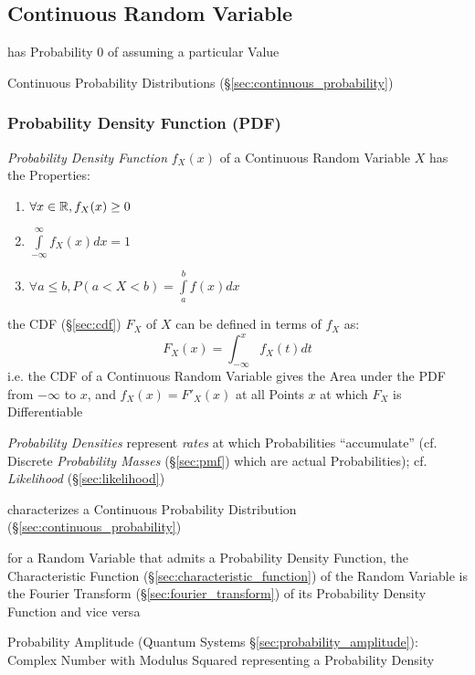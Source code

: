 \subsection{Continuous Random Variable}\label{sec:continuous_random_variable}

has Probability $0$ of assuming a particular Value

\fist Continuous Probability Distributions (\S\ref{sec:continuous_probability})



\subsubsection{Probability Density Function (PDF)}\label{sec:pdf}

\emph{Probability Density Function} $f_X(x)$ of a Continuous Random Variable $X$
has the Properties:
\begin{enumerate}
  \item $\forall x \in \mathbb{R}, f_X(x) \geq 0$
  \item $\int\limits_{-\infty}^{\infty} f_X(x) dx = 1$
  \item $\forall a \leq b, P (a < X < b) = \int\limits_a^b f(x) dx$
\end{enumerate}
the CDF (\S\ref{sec:cdf}) $F_X$ of $X$ can be defined in terms of $f_X$ as:
\[
  F_X(x) = \int_{-\infty}^x f_X(t)dt
\]
i.e. the CDF of a Continuous Random Variable gives the Area under the PDF from
$-\infty$ to $x$, and $f_X(x) = F'_X(x)$ at all Points $x$ at which $F_X$ is
Differentiable

\emph{Probability Densities} represent \emph{rates} at which Probabilities
``accumulate'' (cf. Discrete \emph{Probability Masses} (\S\ref{sec:pmf}) which
are actual Probabilities); cf. \emph{Likelihood} (\S\ref{sec:likelihood})

characterizes a Continuous Probability Distribution
(\S\ref{sec:continuous_probability})

for a Random Variable that admits a Probability Density Function, the
Characteristic Function (\S\ref{sec:characteristic_function}) of the Random
Variable is the Fourier Transform (\S\ref{sec:fourier_transform}) of its
Probability Density Function and vice versa

\fist Probability Amplitude (Quantum Systems \S\ref{sec:probability_amplitude}):
Complex Number with Modulus Squared representing a Probability Density

